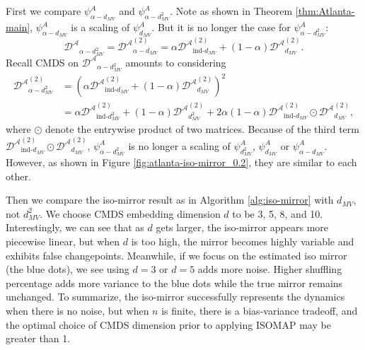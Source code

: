 \documentclass[12pt]{article}
\theoremstyle{definition}
\begin{document}
First we compare 
$\psi^A_{\alpha-d_{MV}}$ and 
$\psi^A_{\alpha-d^2_{MV}}$.
Note as shown in Theorem \ref{thm:Atlanta-main},
$\psi^A_{\alpha-d_{MV}}$ is a scaling of $ \psi^A_{d_{MV}}$. 
But it is no longer the case for $\psi^A_{\alpha-d^2_{MV}}$:
$$
\mathcal{D^A}_{\alpha-d^2_{MV}} 
=\mathcal{D^A}_{\alpha-d_{MV}}^{(2)} 
=   \alpha \mathcal{D^A}_{\text{ind-}d_{MV}}^{(2)} +(1-\alpha) \mathcal{D^A}_{d_{MV}}^{(2)}.
$$
Recall CMDS on $\mathcal{D^A}_{\alpha-d^2_{MV}}$  amounts to considering 
\begin{align*}
\mathcal{D^A}^{(2)}_{\alpha-d^2_{MV}} 
&=  
\left(\alpha \mathcal{D^A}_{\text{ind-}d_{MV}}^{(2)} +(1-\alpha) \mathcal{D^A}_{d_{MV}}^{(2)}
\right)^2\\
&= \alpha \mathcal{D^A}_{\text{ind-}d^2_{MV}}^{(2)} + (1-\alpha) \mathcal{D^A}_{d^2_{MV}}^{(2)} + 2\alpha(1-\alpha) \mathcal{D^A}_{\text{ind-}d_{MV}}^{(2)} \odot \mathcal{D^A}_{d_{MV}}^{(2)}, 
\end{align*}
where $\odot$ denote the entrywise product of two matrices. 
Because of the third term $\mathcal{D^A}_{\text{ind-}d_{MV}}^{(2)} \odot \mathcal{D^A}_{d_{MV}}^{(2)}$, $\psi^A_{\alpha-d^2_{MV}}$ is no longer a scaling of $\psi^A_{d^2_{MV}}$, $\psi^A_{d_{MV}}$ or $\psi^A_{\alpha-d_{MV}}$. 
However, as shown in Figure \ref{fig:atlanta-iso-mirror_0.2}, they are similar to each other.

Then we compare the iso-mirror result as in Algorithm \ref{alg:iso-mirror} with $d_{MV}$, not $d^2_{MV}$. 
We choose CMDS embedding dimension $d$ to be 3, 5, 8, and 10. 
Interestingly, we can see that as $d$ gets larger, the iso-mirror appears more piecewise linear, but when $d$ is too high, the mirror becomes highly variable and exhibits false changepoints. 
Meanwhile, if we focus on the estimated iso mirror (the blue dots), we see using $d=3$ or $d = 5$ adds more noise.
Higher shuffling percentage adds more variance to the blue dots while the true mirror remains unchanged. 
To summarize, the iso-mirror successfully represents the dynamics when there is no noise, but when $n$ is finite, there is a bias-variance tradeoff, and the optimal choice of CMDS dimension prior to applying ISOMAP may be greater than 1. 

\end{document}
